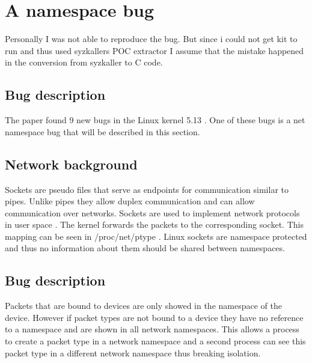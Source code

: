 \documentclass[10pt,twocolumn,a4paper]{article}
\begin{document}
\section{A namespace bug}\label{sec:bug}
Personally I was not able to reproduce the bug. But
since i could not get kit to run and thus used syzkallers POC extractor I assume that the mistake
happened in the conversion from syzkaller to C code\cite{0}.
\subsection{Bug description}
The paper found 9 new bugs in the Linux kernel 5.13 \cite{0}. One of these bugs is a net namespace
bug that will be described in this section. 
\subsection{Network background}
Sockets are pseudo files that serve as endpoints for communication similar to pipes. Unlike pipes
they allow duplex communication and can allow communication over networks\cite{5}. Sockets are
used to implement network protocols in user space \cite{5}. The kernel forwards the packets to the
corresponding socket. This mapping can be seen in /proc/net/ptype \cite{6}. Linux sockets are
namespace protected and thus no information about them should be shared between namespaces.

\subsection{Bug description}
Packets that are bound to devices are only showed in the namespace of the device. However if packet
types are not bound to a device they have no reference to a namespace and are shown in all network
namespaces. This allows a process to create a packet type in a network namespace and a second
process can see this packet type in a different network namespace thus breaking isolation.
\end{document}
